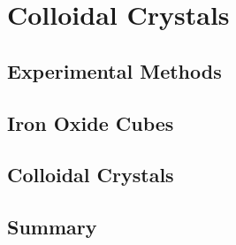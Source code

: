 \documentclass[\main/dresen_thesis.tex]{subfiles}
\renewcommand{\thisPath}{\main/chapters/colloidalCrystals}
\begin{document}
\chapter{Colloidal Crystals}\label{ch:colloidalCrystals}

  
  \FloatBarrier
  \clearpage

  \section{Experimental Methods}
    
      \FloatBarrier
      \clearpage

  \section{Iron Oxide Cubes}
    
      \FloatBarrier
      \clearpage

  \section{Colloidal Crystals}
    
    \FloatBarrier
      \clearpage

  \section{Summary}
    
    \FloatBarrier
\end{document}
